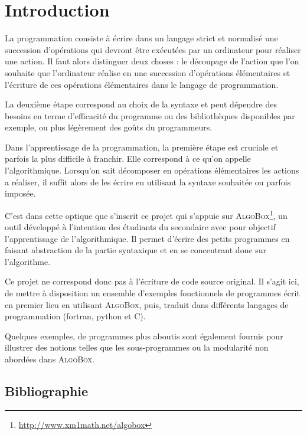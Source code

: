 \chapter*{Introduction}

La programmation consiste à écrire dans un langage strict et normalisé une succession
d'opérations qui devront être exécutées par un ordinateur pour réaliser une action. Il
faut alors distinguer deux choses : le découpage de l'action que l'on souhaite que
l'ordinateur réalise en une succession d'opérations élémentaires et l'écriture de ces
opérations élémentaires dans le langage de programmation.

La deuxième étape correspond au choix de la syntaxe et peut dépendre des besoins en terme
d'efficacité du programme ou des bibliothèques disponibles par exemple, ou plus
légèrement des goûts du programmeurs.

Dans l'apprentissage de la programmation, la première étape est cruciale et parfois la plus 
difficile à franchir. Elle correspond à ce qu'on appelle l'algorithmique. Lorsqu'on sait 
décomposer en opérations élémentaires les actions a réaliser, il suffit alors de les écrire 
en utilisant la syntaxe souhaitée ou parfois imposée.

C'est dans cette optique que s'inscrit ce projet qui s'appuie sur 
\textsc{AlgoBox}\footnote{\url{http://www.xm1math.net/algobox}}, 
un outil développé à l'intention des étudiants 
du secondaire avec pour objectif l'apprentissage de l'algorithmique. Il permet d'écrire
des petits programmes en faisant abstraction de la partie syntaxique et en se concentrant
donc sur l'algorithme.

Ce projet ne correspond donc pas à l'écriture de code source original. Il s'agit ici, de 
mettre à disposition un ensemble d'exemples fonctionnels de programmes écrit en premier
lieu en utilisant \textsc{AlgoBox}, puis, traduit dans 
différents langages de programmation (fortran, python et C).

Quelques exemples, de programmes plus aboutis sont également fournis pour illustrer des
notions telles que les sous-programmes ou la modularité non abordées dans \textsc{AlgoBox}.

\section*{Bibliographie}

